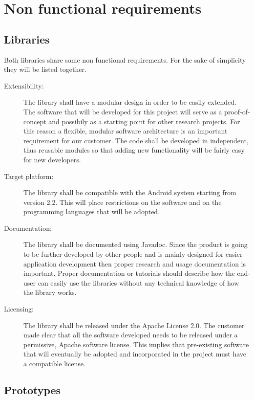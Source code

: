 \section{Non functional requirements}

\subsection{Libraries}

Both libraries share some non functional requirements.
For the sake of simplicity they will be listed together.

\begin{description}
	\item[Extensibility:] The library shall have a modular design
	in order to be easily extended. The software that will be developed for
	this project will serve as a proof-of-concept and possibily as a starting point
	for other research projects. For this reason a flexible, modular software
	architecture is an important requirement for our customer. The code shall be
	developed in independent, thus reusable modules so that adding new functionality
	will be fairly easy for new developers.
	\item[Target platform:] The library shall be compatible with the Android
	system starting from version 2.2. This will place restrictions on the software
	and on the programming languages that will be adopted.
	\item[Documentation:] The library shall be documented using Javadoc.
	Since the product is going to be further developed by other people and is
	mainly designed for easier application development then proper research and usage
	documentation is important. Proper documentation or tutorials should describe how
	the end-user can easily use the libraries without any technical knowledge of how
	the library works.
	\item[Licensing:] The library shall be released under the Apache License 2.0.
	The customer made clear that all the software developed needs to be released
	under a permissive, Apache software license. This implies that pre-existing
	software that will eventually be adopted and incorporated in the project must
	have a compatible license.
\end{description}


\subsection{Prototypes}

